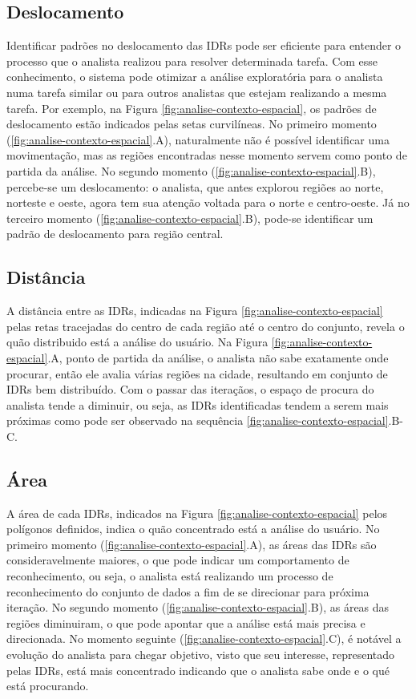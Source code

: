 \subsection{Deslocamento}

Identificar padrões no deslocamento das IDRs pode ser eficiente para entender o processo que o analista realizou para resolver determinada tarefa. Com esse conhecimento, o sistema pode otimizar a análise exploratória para o analista numa tarefa similar ou para outros analistas que estejam realizando a mesma tarefa. Por exemplo, na Figura \ref{fig:analise-contexto-espacial}, os padrões de deslocamento estão indicados pelas setas curvilíneas. No primeiro momento (\ref{fig:analise-contexto-espacial}.A), naturalmente não é possível identificar uma movimentação, mas as regiões encontradas nesse momento servem como ponto de partida da análise. No segundo momento (\ref{fig:analise-contexto-espacial}.B), percebe-se um deslocamento: o analista, que antes explorou regiões ao norte, norteste e oeste, agora tem sua atenção voltada para o norte e centro-oeste. Já no terceiro momento (\ref{fig:analise-contexto-espacial}.B), pode-se identificar um padrão de deslocamento para região central.

\subsection{Distância}

A distância entre as IDRs, indicadas na Figura \ref{fig:analise-contexto-espacial} pelas retas tracejadas do centro de cada região até o centro do conjunto, revela o quão distribuido está a análise do usuário. Na Figura \ref{fig:analise-contexto-espacial}.A, ponto de partida da análise, o analista não sabe exatamente onde procurar, então ele avalia várias regiões na cidade, resultando em conjunto de IDRs bem distribuído. Com o passar das iteraçãos, o espaço de procura do analista tende a diminuir, ou seja, as IDRs identificadas tendem a serem mais próximas como pode ser observado na sequência \ref{fig:analise-contexto-espacial}.B-C.

\subsection{Área}

A área de cada IDRs, indicados na Figura \ref{fig:analise-contexto-espacial} pelos polígonos definidos, indica o quão concentrado está a análise do usuário. No primeiro momento (\ref{fig:analise-contexto-espacial}.A), as áreas das IDRs são consideravelmente maiores, o que pode indicar um comportamento de reconhecimento, ou seja, o analista está realizando um processo de reconhecimento do conjunto de dados a fim de se direcionar para próxima iteração. No segundo momento (\ref{fig:analise-contexto-espacial}.B), as áreas das regiões diminuiram, o que pode apontar que a análise está mais precisa e direcionada. No momento seguinte (\ref{fig:analise-contexto-espacial}.C), é notável a evolução do analista para chegar objetivo, visto que seu interesse, representado pelas IDRs, está mais concentrado indicando que o analista sabe onde e o qué está procurando.

